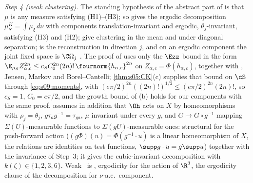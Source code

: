\emph{Step 4 (weak clustering).} The standing hypothesis of the abstract part of \cite{SymPhase} is that $\mu$ is any measure satisfying (H1)--(H3); so \cite[thm:D:decomp]{SymPhase} gives the ergodic decomposition $\mu^K_S=\int\mu_\xi\,d\nu$ with components translation-invariant and ergodic, $\theta_j$-invariant, satisfying (H3) and (H2); \cite[thm:D:mean, thm:D:diag]{SymPhase} give clustering in the mean and under diagonal separation; \cite[prop:D:recon]{SymPhase} is the reconstruction in direction $j$, and on an ergodic component the joint fixed space is $\C\Omega_j$ \cite[prop:D:fixed(iii)]{SymPhase}. The proof of \cite[cor:D:schwinger(iv)]{SymPhase} uses only the $\Ezz$ bound in the form $\E_{\mu_S}Z_{\alpha,c}^{2n}\le c_SC_0^{2n}(2n)!\,\fournorm{h_{\alpha,c}}^{2n}$ on $Z_{\alpha,c}=\Phi(h_{\alpha,c})$, together with \cite[lem:D:hermite(a)]{SymPhase}, Jensen, Markov and Borel--Cantelli; \cref{thm:s05:CK}(c) supplies that bound on $\cS$ through \eqref{eq:s09:moments}, with $(e\pi/2)^{2n}((2n)!)^{1/2}\le(e\pi/2)^{2n}(2n)!$, so $c_S=1$, $C_0=e\pi/2$, and the growth bound of (b) holds for our components with the same proof. \cite[add:Ohdecomp]{SymPhase} assumes in addition that $\Oh$ acts on $X$ by homeomorphisms with $\rho_j=\theta_j$, $g\tau_ag^{-1}=\tau_{ga}$, $\mu$ invariant under every $g$, and $G\mapsto G\circ g^{-1}$ mapping $\Sigma(U)$-measurable functions to $\Sigma(gU)$-measurable ones: structural for the push-forward action ($(g\Phi)(u)=\Phi(g^{-1}\cdot u)$ is a linear homeomorphism of $X$, the relations are identities on test functions, $\supp g\cdot u=g\supp u$) together with the invariance of Step~3; it gives the cubic-invariant decomposition with $k(\zeta)\in\{1,2,3,6\}$. Weak \OSf\ is \cite[add:OS4(iii)]{SymPhase}, ergodicity for the action of $\R^3$, the ergodicity clause of the decomposition for $\nu$-a.e.\ component.

